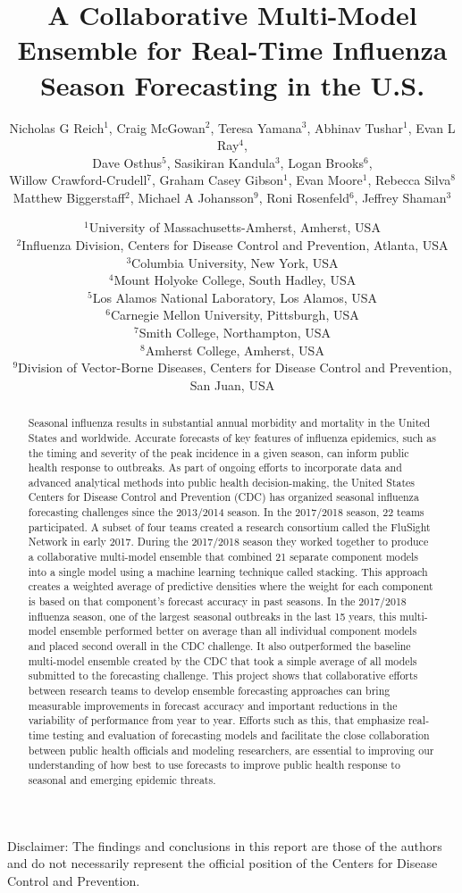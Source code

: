 \documentclass{article}\usepackage[]{graphicx}\usepackage[]{color}
\title{A Collaborative Multi-Model Ensemble for Real-Time Influenza Season Forecasting in the U.S.}
\author{Nicholas G Reich$^1$, Craig McGowan$^2$, Teresa Yamana$^3$, Abhinav Tushar$^1$, Evan L Ray$^4$,\\
Dave Osthus$^5$, Sasikiran Kandula$^3$, Logan Brooks$^6$,\\
Willow Crawford-Crudell$^7$, Graham Casey Gibson$^1$, Evan Moore$^1$, Rebecca Silva$^8$\\Matthew Biggerstaff$^2$, Michael A Johansson$^9$, Roni Rosenfeld$^6$, Jeffrey Shaman$^3$}
\date{%
    $^1$University of Massachusetts-Amherst, Amherst, USA\\%
    $^2$Influenza Division, Centers for Disease Control and Prevention, Atlanta, USA\\
    $^3$Columbia University, New York, USA\\
    $^4$Mount Holyoke College, South Hadley, USA\\
    $^5$Los Alamos National Laboratory, Los Alamos, USA\\
    $^6$Carnegie Mellon University, Pittsburgh, USA\\%
    $^7$Smith College, Northampton, USA\\
    $^8$Amherst College, Amherst, USA\\
    $^9$Division of Vector-Borne Diseases, Centers for Disease Control and Prevention, San Juan, USA\\
}
\begin{document}

\maketitle










Disclaimer: The findings and conclusions in this report are those of the authors and do not necessarily represent the official position of the Centers for Disease Control and Prevention.

\begin{abstract}
Seasonal influenza results in substantial annual morbidity and mortality in the United States and worldwide.
Accurate forecasts of key features of influenza epidemics, such as the timing and severity of the peak incidence in a given season, can inform public health response to outbreaks.
As part of ongoing efforts to incorporate data and advanced analytical methods into public health decision-making, the United States Centers for Disease Control and Prevention (CDC) has organized seasonal influenza forecasting challenges since the 2013/2014 season. 
In the 2017/2018 season, 22 teams participated. 
A subset of four teams created a research consortium called the FluSight Network in early 2017.
During the 2017/2018 season they worked together to produce a collaborative multi-model ensemble that combined 21 separate component models into a single model using a machine learning technique called stacking.
This approach creates a weighted average of predictive densities where the weight for each component is based on that component's forecast accuracy in past seasons.
In the 2017/2018 influenza season, one of the largest seasonal outbreaks in the last 15 years, this multi-model ensemble performed better on average than all individual component models and placed second overall in the CDC challenge.
It also outperformed the baseline multi-model ensemble created by the CDC that took a simple average of all models submitted to the forecasting challenge.
This project shows that collaborative efforts between research teams to develop ensemble forecasting approaches can bring measurable improvements in forecast accuracy and important reductions in the variability of performance from year to year.
Efforts such as this, that emphasize real-time testing and evaluation of forecasting models and facilitate the close collaboration between public health officials and modeling researchers, are essential to improving our understanding of how best to use forecasts to improve public health response to seasonal and emerging epidemic threats.
\end{abstract}
\end{document}
